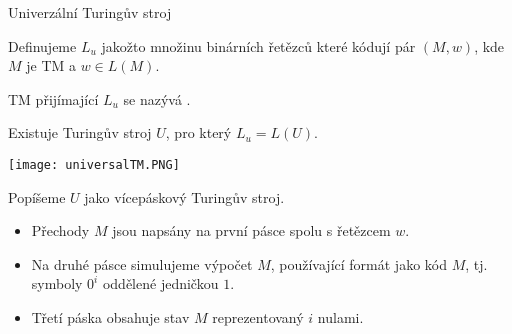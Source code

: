     
    \begin{frame}{Univerzální Turingův stroj}
    \begin{definition}
    Definujeme  $L_u$ jakožto množinu binárních řetězců které kódují pár $(M,w)$, kde $M$ je TM a $w \in L(M)$.
    
    TM přijímající $L_u$ se nazývá .
    \end{definition}
    \pause
    \begin{theorem}
    Existuje Turingův stroj $U$, pro který $L_u=L(U)$.
    \end{theorem}
    \begin{minipage}{0.37\textwidth}
    \texttt{[image: universalTM.PNG]}
    \end{minipage}
    \begin{minipage}{0.01\textwidth}
    \end{minipage}
    \begin{minipage}{0.61\textwidth}
    Popíšeme $U$ jako vícepáskový Turingův stroj.
    \begin{itemize}[<+->]
        \item Přechody $M$ jsou napsány na první pásce spolu s řetězcem $w$.
        \item Na druhé pásce simulujeme výpočet $M$, používající formát jako kód $M$, tj. symboly $0^i$ oddělené jedničkou $1$.
        \item Třetí páska obsahuje stav $M$ reprezentovaný $i$ nulami.
    \end{itemize}
    \end{minipage}
    \end{frame}
    
